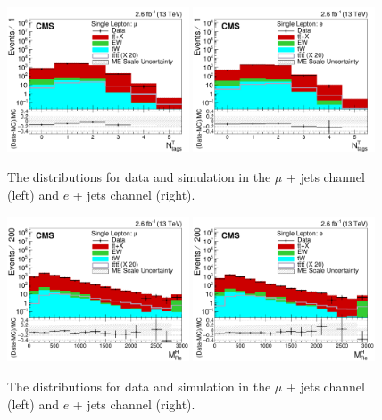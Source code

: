 \begin{figure}[ht!]
    \includegraphics[width=0.48\textwidth]{images/Run2/nTtags_StackLogY.pdf}
    \includegraphics[width=0.48\textwidth]{images/Run2/nTtags_StackLogY_e.pdf}
    \caption{The \nTtags distributions for data and simulation in the $\mu$ + jets channel (left) and $e$ + jets channel (right).}
    \label{fig:nTtagsInc}
\end{figure}

\begin{figure}[ht!]
    \includegraphics[width=0.48\textwidth]{images/Run2/SumJetMassX_StackLogY.pdf}
    \includegraphics[width=0.48\textwidth]{images/Run2/SumJetMassX_StackLogY_e.pdf}
    \caption{The \redhadmass distributions for data and simulation in the $\mu$ + jets channel (left) and $e$ + jets channel (right).}
    \label{fig:SumJetMassX}
\end{figure}

